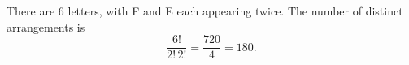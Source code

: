 There are $6$ letters, with F and E each appearing twice. The number of distinct arrangements is
\[
\dfrac{6!}{2!\,2!}=\dfrac{720}{4}=\boxed{180}.
\]
